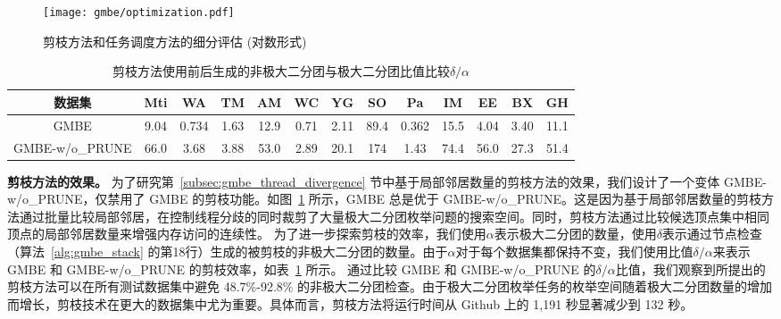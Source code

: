 \begin{figure}[t]
	\centering
  \vspace{0.05in}
	\texttt{[image: gmbe/optimization.pdf]}	
	\vspace{0.05in}
  \caption{剪枝方法和任务调度方法的细分评估 (对数形式)}
	\label{fig:gmbe_exp_optimization}
\end{figure}

\begin{table}[t]
  \setlength{\belowcaptionskip}{-0.2cm}
	\centering
	\caption{ 剪枝方法使用前后生成的非极大二分团与极大二分团比值比较$\delta/\alpha$}
	\label{tbl:gmbe_prune}
	\begin{center}
    \setlength{\tabcolsep}{2pt}
		\normalsize
    {
			\begin{tabular}{|c|c|c|c|c|c|c|c|c|c|c|c|c|}
				\hline
        \textbf{数据集} &Mti &WA &TM &AM &WC &YG &SO &Pa &IM &EE &BX &GH \\ \hline
        GMBE &9.04 &0.734 &1.63 &12.9 &0.71 &2.11 &89.4 &0.362 &15.5 &4.04 &3.40 &11.1 \\ 
        GMBE-w/o\_PRUNE &66.0 &3.68 &3.88 &53.0 &2.89 &20.1 &174 &1.43 &74.4 &56.0 &27.3 &51.4 \\ \hline
        

      \end{tabular}
		}
	\end{center}
  \vspace{-0.1in}
\end{table}

\textbf{剪枝方法的效果。} 为了研究第~\ref{subsec:gmbe_thread_divergence} 节中基于局部邻居数量的剪枝方法的效果，我们设计了一个变体 GMBE-w/o\_PRUNE，仅禁用了 GMBE 的剪枝功能。如图~\ref{fig:gmbe_exp_optimization} 所示，GMBE 总是优于 GMBE-w/o\_PRUNE。这是因为基于局部邻居数量的剪枝方法通过批量比较局部邻居，在控制线程分歧的同时裁剪了大量极大二分团枚举问题的搜索空间。同时，剪枝方法通过比较候选顶点集中相同顶点的局部邻居数量来增强内存访问的连续性。
为了进一步探索剪枝的效率，我们使用$\alpha$表示极大二分团的数量，使用$\delta$表示通过节点检查（算法~\ref{alg:gmbe_stack} 的第18行）生成的被剪枝的非极大二分团的数量。由于$\alpha$对于每个数据集都保持不变，我们使用比值$\delta/\alpha$来表示 GMBE 和 GMBE-w/o\_PRUNE 的剪枝效率，如表~\ref{tbl:gmbe_prune} 所示。
通过比较 GMBE 和 GMBE-w/o\_PRUNE 的$\delta/\alpha$比值，我们观察到所提出的剪枝方法可以在所有测试数据集中避免 48.7\%-92.8\% 的非极大二分团检查。由于极大二分团枚举任务的枚举空间随着极大二分团数量的增加而增长，剪枝技术在更大的数据集中尤为重要。具体而言，剪枝方法将运行时间从 Github 上的 1,191 秒显著减少到 132 秒。

